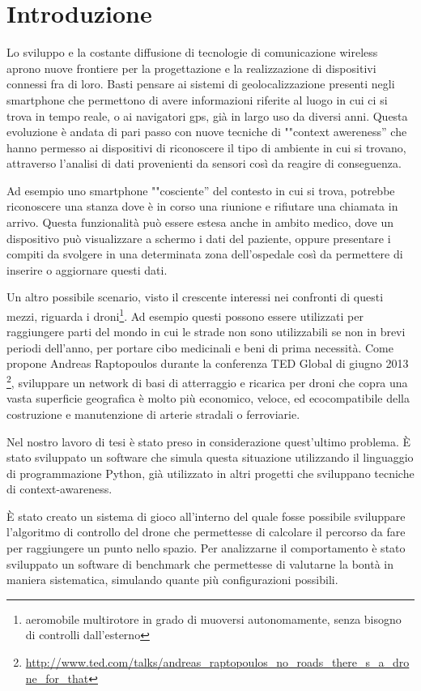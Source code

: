 \chapter*{Introduzione}
Lo sviluppo e la costante diffusione di tecnologie di comunicazione wireless aprono nuove frontiere per la progettazione e la realizzazione di dispositivi connessi fra di loro. Basti pensare ai sistemi di geolocalizzazione presenti negli smartphone che permettono di avere informazioni riferite al luogo in cui ci si trova in tempo reale, o ai navigatori gps, già in largo uso da diversi anni. Questa evoluzione è andata di pari passo con nuove tecniche di ""context awereness'' che hanno permesso ai dispositivi di riconoscere il tipo di ambiente in cui si trovano, attraverso l'analisi di dati provenienti da sensori così da reagire di conseguenza. 

Ad esempio uno smartphone ""cosciente'' del contesto in cui si trova, potrebbe riconoscere una stanza dove è in corso una riunione e rifiutare una chiamata in arrivo. Questa funzionalità può essere estesa anche in ambito medico, dove un dispositivo può visualizzare a schermo i dati del paziente, oppure presentare i compiti da svolgere in una determinata zona dell'ospedale così da permettere di inserire o aggiornare questi dati. 

Un altro possibile scenario, visto il crescente interessi nei confronti di questi mezzi, riguarda i droni\footnote{aeromobile multirotore in grado di muoversi autonomamente, senza bisogno di controlli dall'esterno}. Ad esempio questi possono essere utilizzati per raggiungere parti del mondo in cui le strade non sono utilizzabili se non in brevi periodi dell'anno, per portare cibo medicinali e beni di prima necessità. Come propone Andreas Raptopoulos durante la conferenza TED Global di giugno 2013
\footnote{ \url{http://www.ted.com/talks/andreas_raptopoulos_no_roads_there_s_a_drone_for_that} }, sviluppare un network di basi di atterraggio e ricarica per droni che copra una vasta superficie geografica è molto più economico, veloce, ed ecocompatibile della costruzione e manutenzione di arterie stradali o ferroviarie.

Nel nostro lavoro di tesi è stato preso in considerazione quest'ultimo problema. È stato sviluppato un software che simula questa situazione utilizzando il linguaggio di programmazione Python, già utilizzato in altri progetti che sviluppano tecniche di context-awareness.

È stato creato un sistema di gioco all'interno del quale fosse possibile sviluppare l'algoritmo di controllo del drone che permettesse di calcolare il percorso da fare per raggiungere un punto nello spazio. Per analizzarne il comportamento è stato sviluppato un software di benchmark che permettesse di valutarne la bontà in maniera sistematica, simulando quante più configurazioni possibili.

